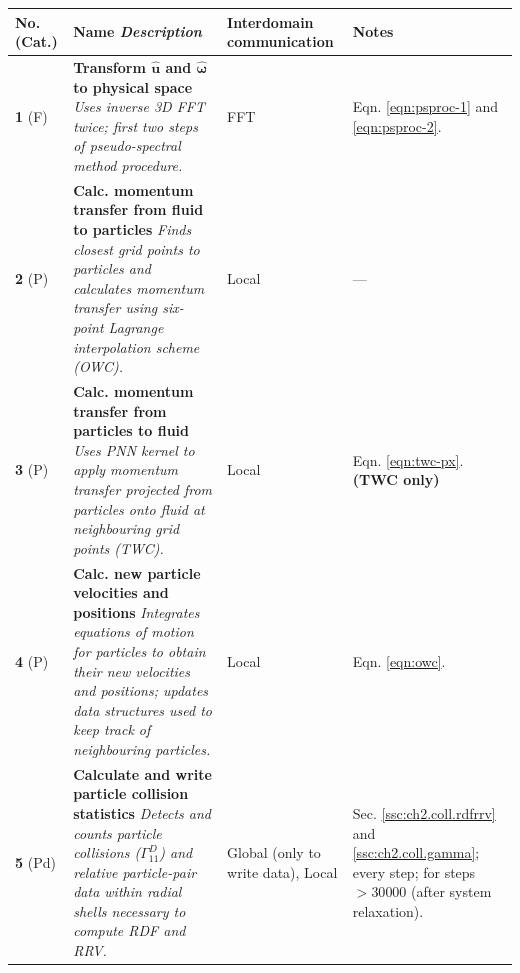 \documentclass{pracamgren}
\begin{document}
\begin{table}[!htbp]
\centering
\scriptsize
\begin{tabular}{p{10mm}p{75mm}p{25mm}p{27mm}}
\textbf{No.} \newline (Cat.) & \textbf{Name} \newline \emph{Description} & \textbf{Interdomain \newline communication} & \textbf{Notes} \\ \hline \hline
\rowcolor[RGB]{190,240,220} \textbf{1} \newline (F) & 
\textbf{Transform $\mathbf{\hat{u}}$ and $\boldsymbol{\hat{\omega}}$ to physical space} \newline \emph{Uses inverse 3D FFT twice; first two steps of pseudo-spectral method procedure.} & FFT & Eqn. \ref{eqn:psproc-1} and \ref{eqn:psproc-2}. \\ 
\rowcolor[RGB]{240,220,190} \textbf{2} \newline (P) & 
\textbf{Calc. momentum transfer from fluid to particles} \newline \emph{Finds closest grid points to particles and calculates momentum transfer using six-point Lagrange interpolation scheme (OWC).} & Local & --- \\ 
\rowcolor[RGB]{240,190,150} \textbf{3} \newline (P) &
\textbf{Calc. momentum transfer from particles to fluid} \newline \emph{Uses PNN kernel to apply momentum transfer projected from particles onto fluid at neighbouring grid points (TWC).} & Local & Eqn. \ref{eqn:twc-px}. \newline \textbf{(TWC only)} \\ 
\rowcolor[RGB]{240,220,190} \textbf{4} \newline (P) &
\textbf{Calc. new particle velocities and positions} \newline \emph{Integrates equations of motion for particles to obtain their new velocities and positions; updates data structures used to keep track of neighbouring particles.} & Local & Eqn. \ref{eqn:owc}. \\ 
\rowcolor[RGB]{240,240,170} \textbf{5} \newline (Pd) &
\textbf{Calculate and write particle collision statistics} \newline \emph{Detects and counts particle collisions ($\Gamma^D_{11}$) and relative particle-pair data within radial shells necessary to compute RDF and RRV.}  & Global (only to \newline write data), Local & Sec. \ref{ssc:ch2.coll.rdfrrv} and \ref{ssc:ch2.coll.gamma}; \newline every step;  for steps \newline $> 30 000$ (after \newline system relaxation). \\ 

\end{tabular}
\end{table}
\end{document}
